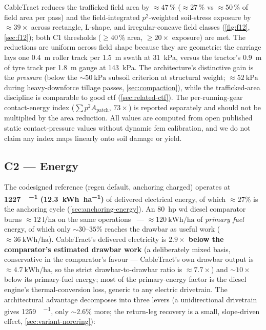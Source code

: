 \documentclass[11pt,a4paper]{article}
\begin{document}
CableTract reduces the trafficked field area by \textbf{${\approx}47\,\%$} (${\approx}27\,\%$ vs ${\approx}50\,\%$ of field area per pass) and the field-integrated $p^2$-weighted soil-stress exposure by \textbf{${\approx}39\times$} across rectangle, L-shape, and irregular-concave field classes (\cref{fig:f12}, \cref{sec:f12}); both C1 thresholds (${\geq}40\,\%$ area, ${\geq}20\times$ exposure) are met. The reductions are uniform across field shape because they are geometric: the carriage lays one \SI{0.4}{\meter} roller track per \SI{1.5}{\meter} swath at \SI{31}{\kilo\pascal}, versus the tractor's \SI{0.9}{\meter} of tyre track per \SI{1.8}{\meter} gauge at \SI{143}{\kilo\pascal}. The architecture's distinctive gain is the \emph{pressure} (below the ${\sim}\SI{50}{\kilo\pascal}$ subsoil criterion at structural weight; ${\approx}\SI{52}{\kilo\pascal}$ during heavy-downforce tillage passes, \cref{sec:compaction}), while the trafficked-area discipline is comparable to good \gls{ctf} (\cref{sec:related-ctf}). The per-running-gear contact-energy index ($\sum p^2 A_{\text{patch}}$, $73\times$) is reported separately and should not be multiplied by the area reduction. All values are computed from open published static contact-pressure values without dynamic \gls{fem} calibration, and we do not claim any index maps linearly onto soil damage or yield.

\subsection{C2 --- Energy}\label{sec:r-c2}

The codesigned reference (regen default, anchoring charged) operates at \textbf{\SI{1227}{\Wh\per\decare} (\SI{12.3}{\kWh\per\hectare})} of delivered electrical energy, of which ${\approx}27\%$ is the anchoring cycle (\cref{sec:anchoring-energy}). An \SI{80}{hp} \gls{wd} diesel comparator burns ${\approx}\SI{12}{\litre\per\hectare}$ on the same operations~\cite{asabe-d497,siemens1999machinery} --- ${\approx}\SI{120}{\kWh\per\hectare}$ of \emph{primary fuel} energy, of which only ${\sim}30\text{--}35\%$ reaches the drawbar as useful work (${\approx}\SI{36}{\kWh\per\hectare}$). CableTract's delivered electricity is \textbf{$2.9\times$ below the comparator's estimated drawbar work} (a deliberately mixed basis, conservative in the comparator's favour --- CableTract's own drawbar output is ${\approx}\SI{4.7}{\kWh\per\hectare}$, so the strict drawbar-to-drawbar ratio is ${\approx}7.7\times$) and ${\sim}10\times$ below its primary-fuel energy; most of the primary-energy factor is the diesel engine's thermal-conversion loss, generic to any electric drivetrain. The architectural advantage decomposes into three levers (a unidirectional drivetrain gives \SI{1259}{\Wh\per\decare}, only ${\sim}2.6\%$ more; the return-leg recovery is a small, slope-driven effect, \cref{sec:variant-norering}):
\end{document}
